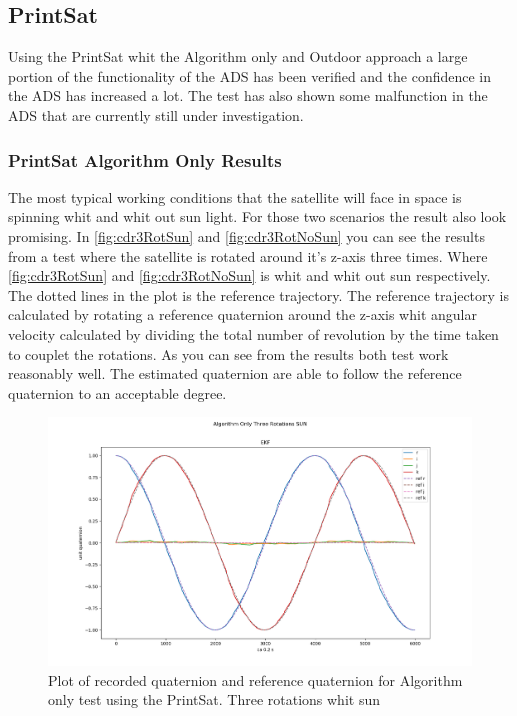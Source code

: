 \subsection{PrintSat}
Using the PrintSat whit the Algorithm only and Outdoor approach a large portion of the functionality of the ADS has been verified and the confidence in the ADS has increased a lot. The test has also shown some malfunction in the ADS that are currently still under investigation. 

\subsubsection{PrintSat Algorithm Only Results}
The most typical working conditions that the satellite will face in space is spinning whit and whit out sun light. For those two scenarios the result also look promising. In \autoref{fig:cdr3RotSun} and \autoref{fig:cdr3RotNoSun} you can see the results from a test where the satellite is rotated around it's z-axis three times. Where \autoref{fig:cdr3RotSun} and \autoref{fig:cdr3RotNoSun} is whit and whit out sun respectively. The dotted lines in the plot is the reference trajectory. The reference trajectory is calculated by rotating a reference quaternion around the z-axis whit angular velocity calculated by dividing the total number of revolution by the time taken to couplet the rotations. As you can see from the results both test work reasonably well. The estimated quaternion are able to follow the reference quaternion to an acceptable degree. 

\begin{figure}[tbp]
	\centering
	\includegraphics[width=1\columnwidth]{./Pictures/cdrRun3ThreeRotationsSun}
	\caption{Plot of recorded quaternion and reference quaternion for Algorithm only test using the PrintSat. Three rotations whit sun}
	\label{fig:cdr3RotSun}
\end{figure}               

